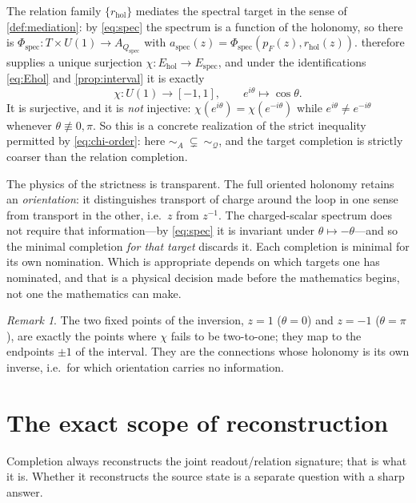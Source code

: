 \documentclass[11pt,reqno]{amsart}
\theoremstyle{plain}
\theoremstyle{definition}
\theoremstyle{remark}
\newtheorem{remark}[theorem]{Remark}
\numberwithin{equation}{section}
\begin{document}
The relation family $\{r_{\mathrm{hol}}\}$ mediates the spectral target in the sense of
\cref{def:mediation}: by \eqref{eq:spec} the spectrum is a function of the holonomy, so there is
$\Phi_{\mathrm{spec}}\colon T\times U(1)\to A_{Q_{\mathrm{spec}}}$ with
$a_{\mathrm{spec}}(z)=\Phi_{\mathrm{spec}}(p_F(z),r_{\mathrm{hol}}(z))$.  therefore
supplies a unique surjection $\chi\colon E_{\mathrm{hol}}\to E_{\mathrm{spec}}$, and under the
identifications \eqref{eq:Ehol} and \cref{prop:interval} it is exactly
\begin{equation}
\label{eq:chi-u1}
\chi\colon U(1)\longrightarrow[-1,1],
\qquad
e^{i\theta}\longmapsto\cos\theta .
\end{equation}
It is surjective, and it is \emph{not} injective: $\chi(e^{i\theta})=\chi(e^{-i\theta})$ while
$e^{i\theta}\neq e^{-i\theta}$ whenever $\theta\not\equiv0,\pi$. So this is a concrete realization of
the strict inequality permitted by \eqref{eq:chi-order}: here $\sim_A\ \subsetneq\ \sim_{\mathcal Q}$,
and the target completion is strictly coarser than the relation completion.

The physics of the strictness is transparent. The full oriented holonomy retains an
\emph{orientation}: it distinguishes transport of charge around the loop in one sense from transport
in the other, i.e.\ $z$ from $z^{-1}$. The charged-scalar spectrum does not require that
information---by \eqref{eq:spec} it is invariant under $\theta\mapsto-\theta$---and so the minimal
completion \emph{for that target} discards it. Each completion is minimal for its own nomination.
Which is appropriate depends on which targets one has nominated, and that is a physical decision made
before the mathematics begins, not one the mathematics can make.

\begin{remark}
\label{rem:u1-endpoints}
The two fixed points of the inversion, $z=1$ ($\theta=0$) and $z=-1$ ($\theta=\pi$), are exactly the
points where $\chi$ fails to be two-to-one; they map to the endpoints $\pm1$ of the interval. They are
the connections whose holonomy is its own inverse, i.e.\ for which orientation carries no information.
\end{remark}

\section{The exact scope of reconstruction}
\label{sec:reconstruction}

Completion always reconstructs the joint readout/relation signature; that is what it is. Whether it
reconstructs the source state is a separate question with a sharp answer.
\end{document}

